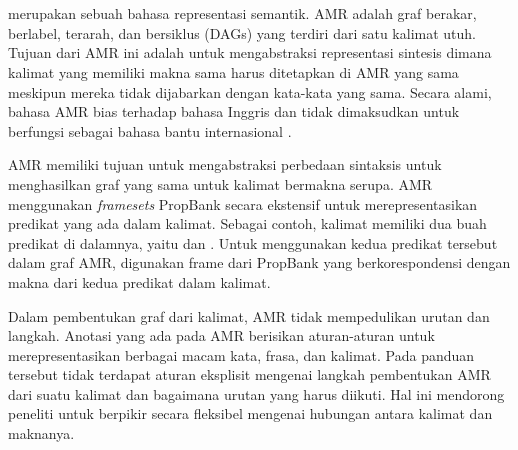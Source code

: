 \section{}

 merupakan sebuah bahasa representasi semantik.
\gls{AMR} adalah graf berakar, berlabel, terarah, dan bersiklus (DAGs) yang terdiri dari satu kalimat utuh.
Tujuan dari \gls{AMR} ini adalah untuk mengabstraksi representasi sintesis dimana kalimat yang memiliki makna sama harus ditetapkan di \gls{AMR} yang sama meskipun mereka tidak dijabarkan dengan kata-kata yang sama.
Secara alami, bahasa \gls{AMR} bias terhadap bahasa Inggris dan tidak dimaksudkan untuk berfungsi sebagai bahasa bantu internasional .

\gls{AMR} memiliki tujuan untuk mengabstraksi perbedaan sintaksis untuk menghasilkan graf yang sama untuk kalimat bermakna serupa.
\gls{AMR} menggunakan \textit{framesets} PropBank  secara ekstensif untuk merepresentasikan predikat yang ada dalam kalimat.
Sebagai contoh, kalimat  memiliki dua buah predikat di dalamnya, yaitu  dan .
Untuk menggunakan kedua predikat tersebut dalam graf \gls{AMR}, digunakan frame dari PropBank yang berkorespondensi dengan makna dari kedua predikat dalam kalimat.

Dalam pembentukan graf dari kalimat, \gls{AMR} tidak mempedulikan urutan dan langkah.
Anotasi yang ada pada \gls{AMR} berisikan aturan-aturan untuk merepresentasikan berbagai macam kata, frasa, dan kalimat.
Pada panduan tersebut tidak terdapat aturan eksplisit mengenai langkah pembentukan \gls{AMR} dari suatu kalimat dan bagaimana urutan yang harus diikuti.
Hal ini mendorong peneliti untuk berpikir secara fleksibel mengenai hubungan antara kalimat dan maknanya.
